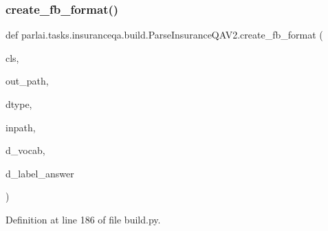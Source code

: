 \subsubsection{\texorpdfstring{create\+\_\+fb\+\_\+format()}{create\_fb\_format()}}
{\footnotesize\ttfamily def parlai.\+tasks.\+insuranceqa.\+build.\+Parse\+Insurance\+Q\+A\+V2.\+create\+\_\+fb\+\_\+format (\begin{DoxyParamCaption}\item[{}]{cls,  }\item[{}]{out\+\_\+path,  }\item[{}]{dtype,  }\item[{}]{inpath,  }\item[{}]{d\+\_\+vocab,  }\item[{}]{d\+\_\+label\+\_\+answer }\end{DoxyParamCaption})}



Definition at line 186 of file build.\+py.


